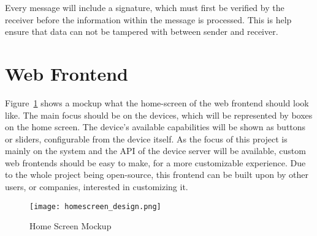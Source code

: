Every message will include a signature, which must first be verified by the receiver before the information within the message is processed. This is help ensure that data can not be tampered with between sender and receiver.


\section{Web Frontend} \label{sec:chapdesign:frontend}
Figure~\ref{fig:home_screen_mockup} shows a mockup what the home-screen of the web frontend should look like. The main focus should be on the devices, which will be represented by boxes on the home screen. The device's available capabilities will be shown as buttons or sliders, configurable from the device itself. As the focus of this project is mainly on the system and the API of the device server will be available, custom web frontends should be easy to make, for a more customizable experience. Due to the whole project being open-source, this frontend can be built upon by other users, or companies, interested in customizing it.

\begin{figure}[h]
\caption{Home Screen Mockup}
\texttt{[image: homescreen\_design.png]}
\label{fig:home_screen_mockup}
\end{figure}

